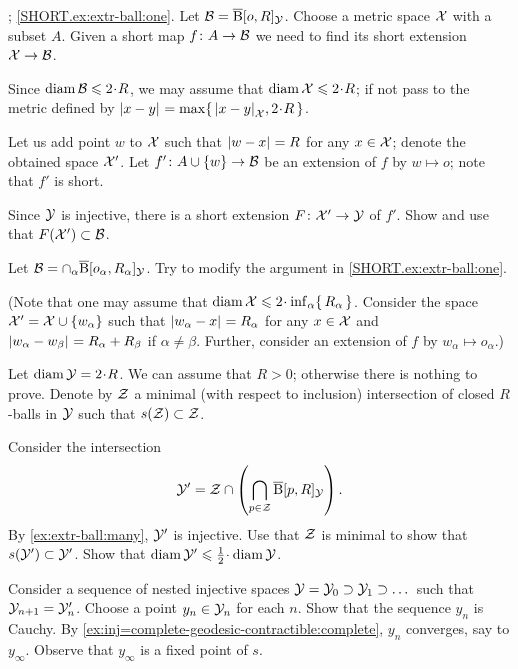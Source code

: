 \parbf{\ref{ex:extr-ball}}; \ref{SHORT.ex:extr-ball:one}.
Let $\mathcal{B}=\overline{\mathrm{B}}{}[o,R]_{\mathcal{Y}}$.
Choose a metric space $\mathcal{X}$ with a subset $A$.
Given a short map $f\colon A\to \mathcal{B}$ we need to find its short extension $\mathcal{X}\to \mathcal{B}$.

Since $\diam\spc{B}\le 2\cdot R$, we may assume that  $\diam \spc{X}\le 2\cdot R$;
if not pass to the metric defined by $\dist{x}{y}{}=\max\{\,\dist{x}{y}{\spc{X}},2\cdot R\,\}$.

Let us add point $w$ to $\mathcal{X}$ such that $\dist{w}{x}{}=R$ for any $x\in\mathcal{X}$;
denote the obtained space $\mathcal{X}'$.
Let $f'\colon A\cup\{w\}\to \mathcal{B}$ be an extension of $f$ by $w\mapsto o$; note that $f'$ is short.

Since $\mathcal{Y}$ is injective, there is a short extension $F\colon\mathcal{X}'\to \mathcal{Y}$ of $f'$.
Show and use that $F(\mathcal{X}')\subset \mathcal{B}$.

Let $\mathcal{B}=\cap_\alpha\overline{\mathrm{B}}{}[o_\alpha,R_\alpha]_{\mathcal{Y}}$.
Try to modify the argument in \ref{SHORT.ex:extr-ball:one}.

(Note that one may assume that $\diam \spc{X}\le 2\cdot \inf_\alpha\{\,R_\alpha\,\}$.
Consider the space $\mathcal{X}'=\mathcal{X}\cup\{w_\alpha\}$ such that $\dist{w_\alpha}{x}{}=R_\alpha$ for any $x\in \mathcal{X}$ and $\dist{w_\alpha}{w_\beta}{}=R_\alpha+R_\beta$ if $\alpha\ne\beta$.
Further, consider an extension of $f$ by $w_\alpha\mapsto o_\alpha$.)

Let $\diam \spc{Y}=2\cdot R$.
We can assume that $R>0$; otherwise there is nothing to prove.
Denote by $\mathcal{Z}$ a minimal (with respect to inclusion) intersection of closed $R$-balls in $\mathcal{Y}$ such that $s(\mathcal{Z})\subset\mathcal{Z}$.

Consider 
the intersection 
\[\mathcal{Y}'=\mathcal{Z}\cap\left(\bigcap_{p\in \mathcal{Z}} \overline{\mathrm{B}}{}[p,R]_{\mathcal{Y}}\right).\]
By \ref{ex:extr-ball:many}, $\mathcal{Y}'$ is injective.
Use that $\mathcal{Z}$ is minimal to show that $s(\mathcal{Y}')\subset \mathcal{Y}'$.
Show that $\diam \spc{Y}'\le \tfrac12\cdot\diam \spc{Y}$.

Consider a sequence of nested injective spaces $\mathcal{Y}=\mathcal{Y}_0\supset \mathcal{Y}_1\supset\dots$ such that $\mathcal{Y}_{n+1}=\mathcal{Y}_{n}'$.
Choose a point $y_n\in \mathcal{Y}_{n}$ for each $n$.
Show that the sequence $y_n$ is Cauchy.
By \ref{ex:inj=complete-geodesic-contractible:complete}, $y_n$ converges, say to $y_\infty$.
Observe that $y_\infty$ is a fixed point of $s$.

